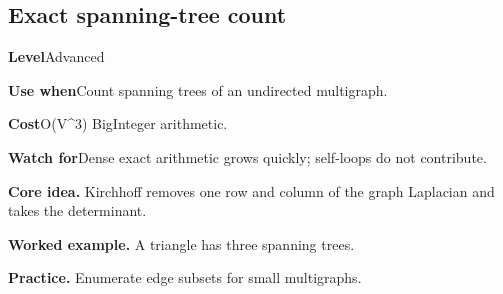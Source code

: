 \documentclass[10pt,letterpaper]{article}
\newcommand{\entrylabel}[1]{\textcolor{accent}{\bfseries #1}}
\begin{document}
\subsection{Exact spanning-tree count}
\begin{guidebox}\small
\entrylabel{Level}\quad Advanced\par
\entrylabel{Use when}\quad Count spanning trees of an undirected multigraph.\par
\entrylabel{Cost}\quad O(V\textasciicircum{}3) BigInteger arithmetic.\par
\entrylabel{Watch for}\quad Dense exact arithmetic grows quickly; self-loops do not contribute.\par
\end{guidebox}
\noindent\textbf{Core idea.} Kirchhoff removes one row and column of the graph Laplacian and takes the determinant.\par
\noindent\textbf{Worked example.} A triangle has three spanning trees.\par
\noindent\textbf{Practice.} Enumerate edge subsets for small multigraphs.\par
\end{document}
